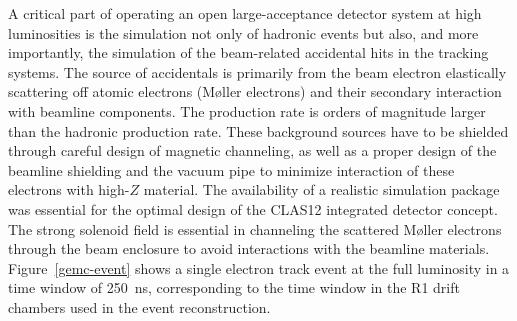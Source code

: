 \documentclass[final,3p,twocolumn]{elsarticle}
\begin{document}
A critical part of operating an open large-acceptance detector system at high luminosities is the simulation not
only of hadronic events but also, and more importantly, the simulation of the beam-related accidental hits in the
tracking systems. The source of accidentals is primarily from the beam electron elastically scattering off atomic
electrons (M{\o}ller electrons) and their secondary interaction with beamline components. The production rate
is orders of magnitude larger than the hadronic production rate. These background sources have to be shielded
through careful design of magnetic channeling, as well as a proper design of the beamline shielding and the vacuum
pipe to minimize interaction of these electrons with high-$Z$ material. The availability of a realistic simulation
package was essential for the optimal design of the CLAS12 integrated detector concept. The strong solenoid
field is essential in channeling the scattered M{\o}ller electrons through the beam enclosure to avoid interactions
with the beamline materials. Figure~\ref{gemc-event} shows a single electron track event at the full
luminosity in a time window of 250~ns, corresponding to the time window in the R1 drift chambers used in the event 
reconstruction. 
 
\end{document}
